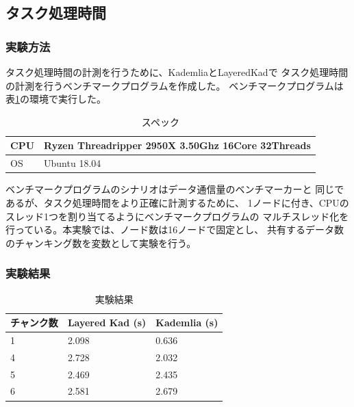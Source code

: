 \documentclass[sotsuron]{jcsie}
\begin{document}
\subsection{タスク処理時間}
\subsubsection{実験方法}
タスク処理時間の計測を行うために、KademliaとLayeredKadで
タスク処理時間の計測を行うベンチマークプログラムを作成した。
ベンチマークプログラムは表\ref{table:spec-ryzen}の環境で実行した。

\begin{table}[H]
	\caption{スペック}	
	\centering
	\label{table:spec-ryzen}
	\begin{tabular}{|l|l|}
		\hline
		CPU &   
		Ryzen Threadripper 2950X 3.50Ghz 16Core 32Threads \\ 
		\hline	
		OS  &   
		Ubuntu 18.04 \\ 
		\hline
	\end{tabular}	
\end{table}

ベンチマークプログラムのシナリオはデータ通信量のベンチマーカーと
同じであるが、タスク処理時間をより正確に計測するために、
1ノードに付き、CPUのスレッド1つを割り当てるようにベンチマークプログラムの
マルチスレッド化を行っている。本実験では、ノード数は16ノードで固定とし、
共有するデータ数のチャンキング数を変数として実験を行う。

\subsubsection{実験結果}
\begin{table}[H]
	\caption{実験結果}	
	\centering
	\label{table:calc-result}
	\begin{tabular}{|l|l|l|}
		\hline
		チャンク数 &   
		Layered Kad (s) &   
		Kademlia (s)\\ 
		\hline
		1               &   
		2.098           &   
		0.636\\
		\hline
		4               &   
		2.728           &   
		2.032\\
		\hline
		5               &   
		2.469           &   
		2.435\\
		\hline
		6               &   
		2.581           &   
		2.679\\
		\hline
	\end{tabular}	
\end{table}
\end{document}
